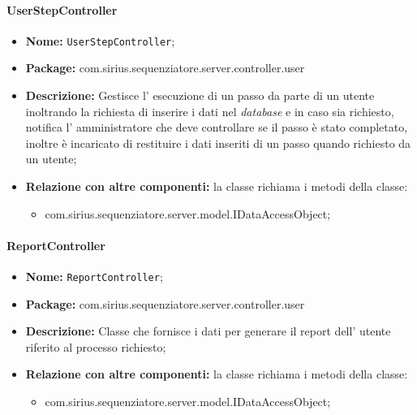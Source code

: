 \paragraph{UserStepController}
	\begin{itemize}
		\item \textbf{Nome:} \texttt{UserStepController};
		\item \textbf{Package:} com.sirius.sequenziatore.server.controller.user
		\item \textbf{Descrizione:} Gestisce l' esecuzione di un passo da parte di un utente inoltrando la richiesta di inserire i dati nel \textit{database} e in caso sia richiesto, notifica l' amministratore che deve controllare se il passo è stato completato, inoltre è incaricato di restituire i dati inseriti di un passo quando richiesto da un utente;
		\item \textbf{Relazione con altre componenti:} la classe richiama i metodi della classe:
		\begin{itemize}
			\item com.sirius.sequenziatore.server.model.IDataAccessObject;
		\end{itemize}
	\end{itemize}
\paragraph{ReportController}
	\begin{itemize}
		\item \textbf{Nome:} \texttt{ReportController};
		\item \textbf{Package:} com.sirius.sequenziatore.server.controller.user
		\item \textbf{Descrizione:} Classe che fornisce i dati per generare il report dell' utente riferito al processo richiesto;
		\item \textbf{Relazione con altre componenti:} la classe richiama i metodi della classe:
		\begin{itemize}
			\item com.sirius.sequenziatore.server.model.IDataAccessObject;
		\end{itemize}
	\end{itemize}
